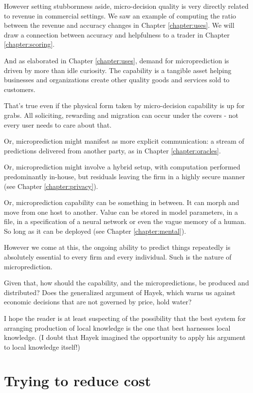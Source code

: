 However setting stubbornness aside, micro-decision quality is very directly related to revenue in commercial settings. We saw an example of computing the ratio between the revenue and accuracy changes in Chapter \ref{chapter:uses}. We will draw a connection between accuracy and helpfulness to a trader in Chapter \ref{chapter:scoring}. 

And as elaborated in Chapter \ref{chapter:uses}, demand for microprediction is driven by more than idle curiosity. The capability is a tangible asset helping businesses and organizations create other quality goods and services sold to customers. 

That's true even if the physical form taken by micro-decision capability is up for grabs. All soliciting, rewarding and migration can occur under the covers - not every user needs to care about that. 

 
Or, microprediction might manifest as more explicit communication: a stream of predictions delivered from another party, as in Chapter \ref{chapter:oracles}.

Or, microprediction might involve a hybrid setup, with computation performed predominantly in-house, but residuals leaving the firm in a highly secure manner (see Chapter \ref{chapter:privacy}). 

Or, microprediction capability can be something in between. It can morph and move from one host to another. Value can be stored in model parameters, in a file, in a specification of a neural network or even the vague memory of a human. So long as it can be deployed (see Chapter \ref{chapter:mental}).  

However we come at this, the ongoing ability to predict things repeatedly is absolutely essential to every firm and every individual.  Such is the nature of microprediction. 

Given that, how should the capability, and the micropredictions, be produced and distributed? Does the generalized argument of Hayek, which warns us against economic decisions that are not governed by price, hold water? 

I hope the reader is at least suspecting of the possibility that the best system for arranging production of local knowledge is the one that best harnesses local knowledge. (I doubt that Hayek imagined the opportunity to apply his argument to local knowledge itself!) 


\section{Trying to reduce cost}

